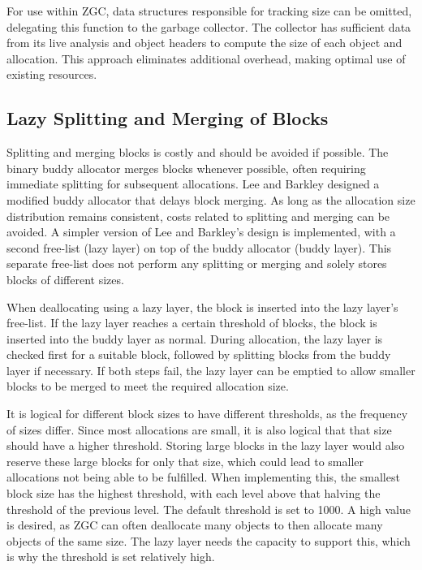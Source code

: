 For use within ZGC, data structures responsible for tracking size can be omitted, delegating this function to the garbage collector. The collector has sufficient data from its live analysis and object headers to compute the size of each object and allocation. This approach eliminates additional overhead, making optimal use of existing resources.

\newpage
\subsection{Lazy Splitting and Merging of Blocks} \label{sec:lazyexpl}
Splitting and merging blocks is costly and should be avoided if possible. The binary buddy allocator merges blocks whenever possible, often requiring immediate splitting for subsequent allocations. Lee and Barkley \cite{lazylayer} designed a modified buddy allocator that delays block merging. As long as the allocation size distribution remains consistent, costs related to splitting and merging can be avoided. A simpler version of Lee and Barkley's design is implemented, with a second free-list (lazy layer) on top of the buddy allocator (buddy layer). This separate free-list does not perform any splitting or merging and solely stores blocks of different sizes.

When deallocating using a lazy layer, the block is inserted into the lazy layer's free-list. If the lazy layer reaches a certain threshold of blocks, the block is inserted into the buddy layer as normal. During allocation, the lazy layer is checked first for a suitable block, followed by splitting blocks from the buddy layer if necessary. If both steps fail, the lazy layer can be emptied to allow smaller blocks to be merged to meet the required allocation size.

It is logical for different block sizes to have different thresholds, as the frequency of sizes differ. Since most allocations are small, it is also logical that that size should have a higher threshold. Storing large blocks in the lazy layer would also reserve these large blocks for only that size, which could lead to smaller allocations not being able to be fulfilled. When implementing this, the smallest block size has the highest threshold, with each level above that halving the threshold of the previous level. The default threshold is set to 1000. A high value is desired, as ZGC can often deallocate many objects to then allocate many objects of the same size. The lazy layer needs the capacity to support this, which is why the threshold is set relatively high.

